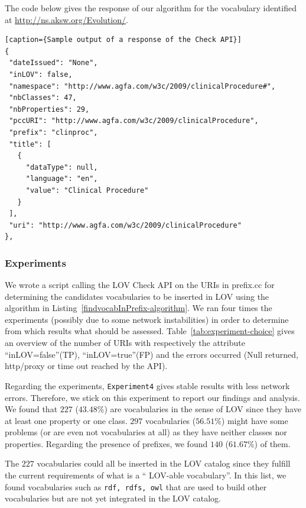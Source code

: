 The code below gives the response of our algorithm for the vocabulary identified at \url{http://ns.aksw.org/Evolution/}.
\begin{verbatim}[caption={Sample output of a response of the Check API}]
{
 "dateIssued": "None",
 "inLOV": false,
 "namespace": "http://www.agfa.com/w3c/2009/clinicalProcedure#",
 "nbClasses": 47,
 "nbProperties": 29,
 "pccURI": "http://www.agfa.com/w3c/2009/clinicalProcedure",
 "prefix": "clinproc",
 "title": [
   {
     "dataType": null,
     "language": "en",
     "value": "Clinical Procedure"
   }
 ],
 "uri": "http://www.agfa.com/w3c/2009/clinicalProcedure"
},
\end{verbatim}

\subsubsection{Experiments} \label{experiments}
We wrote a script calling the LOV Check API on the URIs in prefix.cc for determining the candidates vocabularies to be inserted in LOV using the algorithm in Listing~\ref{findvocabInPrefix-algorithm}. We ran four times the experiments (possibly due to some network instabilities) in order to determine from which results what should be assessed. Table~\ref{tab:experiment-choice} gives an overview of the number of URIs with respectively the attribute ``inLOV=false''(TP), ``inLOV=true''(FP) and the errors occurred (Null returned, http/proxy or time out reached by the API).

Regarding the experiments, \texttt{Experiment4} gives stable results with less network errors. Therefore, we stick on this experiment to report our findings and analysis. We found that $227$ ($43.48$\%) are vocabularies in the sense of LOV since they have at least one property or one class. $297$ vocabularies ($56.51$\%) might have some problems (or are even not vocabularies at all) as they have neither classes nor properties. Regarding the presence of prefixes, we found $140$ ($61.67$\%) of them.
\begin{table}[!htbp]
\end{table}
The $227$ vocabularies could all be inserted in the LOV catalog since they fulfill the current requirements of what is a `` LOV-able vocabulary''. In this list, we found vocabularies such as \texttt{rdf, rdfs, owl} that are used to build other vocabularies but are not yet integrated in the LOV catalog.

